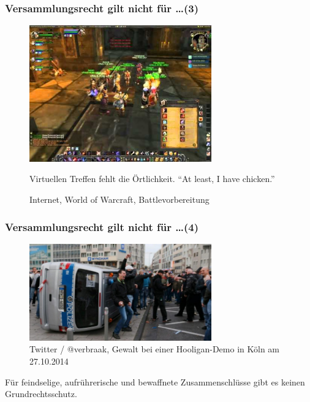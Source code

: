 \documentclass[]{beamer}
\begin{document}
\begin{frame}
	\frametitle{Versammlungsrecht gilt nicht für \dots (3)}
	\begin{figure}[h!]
		\renewcommand{\figurename}{Foto} 
		\includegraphics[width=0.7\textwidth]{images/nicht-fuer-leeroy}
		\caption{Internet, World of Warcraft, Battlevorbereitung}
		Virtuellen Treffen fehlt die Örtlichkeit. \enquote{At least, I have chicken.}
	\end{figure}
\end{frame}

\begin{frame}
	\frametitle{Versammlungsrecht gilt nicht für \dots (4)}
	\begin{figure}[h!]
		\renewcommand{\figurename}{Foto} 
		\includegraphics[width=0.7\textwidth]{images/nicht-fuer-gewalttaeter}
		\caption{Twitter / @verbraak, Gewalt bei einer Hooligan-Demo in Köln am 27.10.2014}
	\end{figure}
	Für feindselige, aufrührerische und bewaffnete Zusammenschlüsse gibt es keinen Grundrechtsschutz.
	\end{frame}
\end{document}
